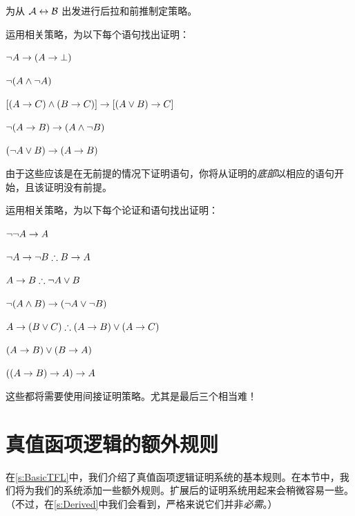 \problempart
为从 $\mathcal{A} \leftrightarrow \mathcal{B}$ 出发进行后拉和前推制定策略。

\problempart
运用相关策略，为以下每个语句找出证明：

\begin{compactlist}
\item $\neg A \rightarrow (A \rightarrow \bot)$
\item $\neg(A \wedge \neg A)$
\item $[(A \rightarrow C) \wedge (B \rightarrow C)] \rightarrow [(A \lor B) \rightarrow C]$
\item $\neg(A \rightarrow B) \rightarrow (A \wedge \neg B)$
\item $(\neg A \vee B) \rightarrow (A \rightarrow B)$
\end{compactlist}

由于这些应该是在无前提的情况下证明语句，你将从证明的\emph{底部}以相应的语句开始，且该证明没有前提。

\problempart
运用相关策略，为以下每个论证和语句找出证明：

\begin{compactlist}
\item $\neg\neg A \rightarrow A$
\item $\enot A \eif \enot B \therefore B \eif A$
\item $A \eif B \therefore \enot A \eor B$
\item $\neg(A \wedge B) \rightarrow (\neg A \vee \neg B)$
\item $A \eif (B \eor C) \therefore (A \eif B) \eor (A \eif C)$
\item $(A \rightarrow B) \lor (B \rightarrow A)$
\item $((A \rightarrow B) \rightarrow A) \rightarrow A$
\end{compactlist}

这些都将需要使用间接证明策略。尤其是最后三个相当难！

\chapter{真值函项逻辑的额外规则}\label{s:Further}
在\cref{s:BasicTFL}中，我们介绍了真值函项逻辑证明系统的基本规则。在本节中，我们将为我们的系统添加一些额外规则。扩展后的证明系统用起来会稍微容易一些。（不过，在\cref{s:Derived}中我们会看到，严格来说它们并非\emph{必需}。）


